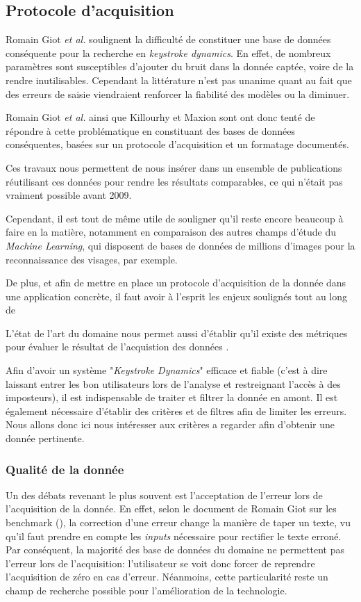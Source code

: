 \subsection{Protocole d'acquisition}

Romain Giot \textit{et al.} \cite{giotGREYC} soulignent la difficulté de constituer une base de données conséquente pour la recherche en \textit{keystroke dynamics}. En effet, de nombreux paramètres sont susceptibles d'ajouter du bruit dans la donnée captée, voire de la rendre inutilisables. Cependant la littérature n'est pas unanime quant au fait que des erreurs de saisie viendraient renforcer la fiabilité des modèles ou la diminuer.

Romain Giot \textit{et al.} \cite{giotGREYC} ainsi que Killourhy et Maxion \cite{killourhy2009} sont ont donc tenté de répondre à cette problématique en constituant des bases de données conséquentes, basées sur un protocole d'acquisition et un formatage documentés.

Ces travaux nous permettent de nous insérer dans un ensemble de publications réutilisant ces données pour rendre les résultats comparables, ce qui n'était pas vraiment possible avant 2009.

Cependant, il est tout de même utile de souligner qu'il reste encore beaucoup à faire en la matière, notamment en comparaison des autres champs d'étude du \textit{Machine Learning}, qui disposent de bases de données de millions d'images pour la reconnaissance des visages, par exemple.

De plus, et afin de mettre en place un protocole d'acquisition de la donnée dans une application concrète, il faut avoir à l'esprit les enjeux soulignés tout au long de 

L'état de l'art du domaine nous permet aussi d'établir qu'il existe des métriques pour évaluer le résultat de l'acquistion des données \cite{giotWeb}.

Afin d'avoir un système "\textit{Keystroke Dynamics}" efficace et fiable (c'est à dire laissant entrer les bon utilisateurs lors de l'analyse et restreignant l'accès à des imposteurs), il est indispensable de traiter et filtrer la donnée en amont. Il est également nécessaire d'établir des critères et de filtres afin de  limiter les erreurs. Nous allons donc ici nous intéresser aux critères a regarder afin d'obtenir une donnée pertinente.

\subsubsection{Qualité de la donnée}
Un des débats revenant le plus souvent est l'acceptation de l'erreur lors de l'acquisition de la donnée. En effet, selon le document de Romain Giot sur les benchmark (\cite{giotBenchmark}), la correction d'une erreur change la manière de taper un texte, vu qu'il faut  prendre en compte les \textit{inputs} nécessaire pour rectifier le texte erroné. Par conséquent, la majorité des base de données du domaine ne permettent pas l'erreur lors de l'acquisition: l'utilisateur se voit donc forcer de reprendre l'acquisition de zéro en cas d'erreur. Néanmoins, cette particularité reste un champ de recherche possible pour l'amélioration de la technologie.

